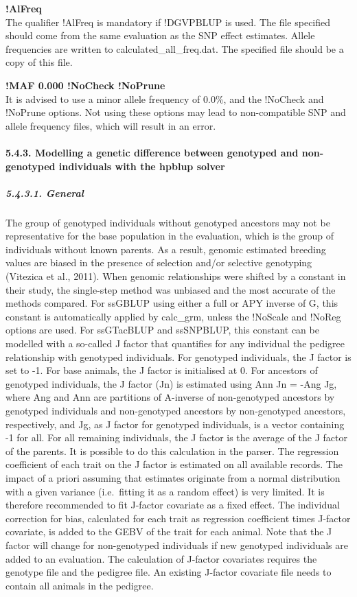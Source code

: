 \textbf{!AlFreq }\\
The qualifier !AlFreq is mandatory if !DGVPBLUP is used. The file
specified should come from the same evaluation as the SNP effect
estimates. Allele frequencies are written to calculated\_all\_freq.dat.
The specified file should be a copy of this file.

\textbf{!MAF 0.000 !NoCheck !NoPrune}\\
It is advised to use a minor allele frequency of 0.0\%, and the !NoCheck
and !NoPrune options. Not using these options may lead to non-compatible
SNP and allele frequency files, which will result in an error.

\paragraph{5.4.3. Modelling a genetic difference between genotyped and
non-genotyped individuals with the hpblup solver}\label{Gene50}

\subparagraph{5.4.3.1. General}\label{Gene51}

The group of genotyped individuals without genotyped ancestors may not
be representative for the base population in the evaluation, which is
the group of individuals without known parents. As a result, genomic
estimated breeding values are biased in the presence of selection and/or
selective genotyping (Vitezica et al., 2011). When genomic relationships
were shifted by a constant in their study, the single-step method was
unbiased and the most accurate of the methods compared. For ssGBLUP
using either a full or APY inverse of G, this constant is automatically
applied by calc\_grm, unless the !NoScale and !NoReg options are used.
For ssGTacBLUP and ssSNPBLUP, this constant can be modelled with a
so-called J factor that quantifies for any individual the pedigree
relationship with genotyped individuals. For genotyped individuals, the
J factor is set to -1. For base animals, the J factor is initialised at
0. For ancestors of genotyped individuals, the J factor (Jn) is
estimated using Ann Jn = -Ang Jg, where Ang and Ann are partitions of
A-inverse of non-genotyped ancestors by genotyped individuals and
non-genotyped ancestors by non-genotyped ancestors, respectively, and
Jg, as J factor for genotyped individuals, is a vector containing -1 for
all. For all remaining individuals, the J factor is the average of the J
factor of the parents. It is possible to do this calculation in the
parser. The regression coefficient of each trait on the J factor is
estimated on all available records. The impact of a priori assuming that
estimates originate from a normal distribution with a given variance
(i.e.~fitting it as a random effect) is very limited. It is therefore
recommended to fit J-factor covariate as a fixed effect. The individual
correction for bias, calculated for each trait as regression coefficient
times J-factor covariate, is added to the GEBV of the trait for each
animal. Note that the J factor will change for non-genotyped individuals
if new genotyped individuals are added to an evaluation. The calculation
of J-factor covariates requires the genotype file and the pedigree file.
An existing J-factor covariate file needs to contain all animals in the
pedigree.

